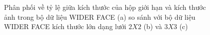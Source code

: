 {    \begin{figure}[H]
        \centering
        \caption{Phân phối về tỷ lệ giữa kích thước của hộp giới hạn và kích thước ảnh trong bộ dữ liệu WIDER FACE \cite{yang2016wider} (a) so sánh với bộ dữ liệu WIDER FACE kích thước lớn dạng lưới $2 X 2$ (b) và $3 X 3$ (c)}
        \label{fig:widerface_4k_scale}
    \end{figure}

}
